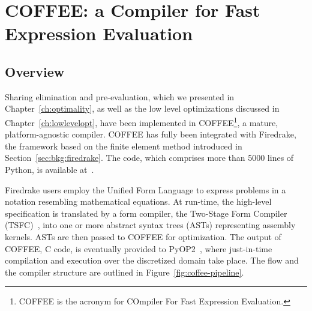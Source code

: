 \chapter{COFFEE: a Compiler for Fast Expression Evaluation}
\label{ch:coffee}

\section{Overview}
Sharing elimination and pre-evaluation, which we presented in Chapter~\ref{ch:optimality}, as well as the low level optimizations discussed in Chapter~\ref{ch:lowlevelopt}, have been implemented in COFFEE\footnote{COFFEE is the acronym for COmpiler For Fast Expression Evaluation.}, a mature, platform-agnostic compiler. COFFEE has fully been integrated with Firedrake, the framework based on the finite element method introduced in Section~\ref{sec:bkg:firedrake}. The code, which comprises more than 5000 lines of Python, is available at~\citep{coffee-code}.

Firedrake users employ the Unified Form Language to express problems in a notation resembling mathematical equations. At run-time, the high-level specification is translated by a form compiler, the Two-Stage Form Compiler (TSFC)~\cite{TSFC-Compiler}, into one or more abstract syntax trees (ASTs) representing assembly kernels. ASTs are then passed to COFFEE for optimization. The output of COFFEE, C code, is eventually provided to PyOP2~\citep{pyop2isc}, where just-in-time compilation and execution over the discretized domain take place. The flow and the compiler structure are outlined in Figure~\ref{fig:coffee-pipeline}. 

